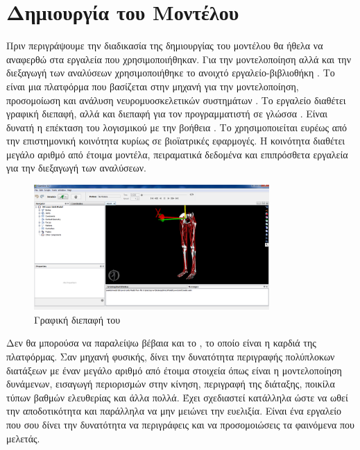 \section{Δημιουργία του Μοντέλου}

Πριν περιγράψουμε την διαδικασία της δημιουργίας του μοντέλου θα ήθελα να αναφερθώ στα εργαλεία που χρησιμοποιήθηκαν. Για την μοντελοποίηση αλλά και την διεξαγωγή των αναλύσεων χρησιμοποιήθηκε το ανοιχτό εργαλείο-βιβλιοθήκη . Το  είναι μια πλατφόρμα που βασίζεται στην μηχανή  για την μοντελοποίηση, προσομοίωση και ανάλυση νευρομυοσκελετικών συστημάτων \cite{delp07}. Το εργαλείο διαθέτει γραφική διεπαφή, αλλά και διεπαφή για τον προγραμματιστή σε γλώσσα . Είναι δυνατή η επέκταση του λογισμικού με την βοήθεια . Το  χρησιμοποιείται ευρέως από την επιστημονική κοινότητα κυρίως σε βιοϊατρικές εφαρμογές. Η κοινότητα διαθέτει μεγάλο αριθμό από έτοιμα μοντέλα, πειραματικά δεδομένα και επιπρόσθετα εργαλεία για την διεξαγωγή των αναλύσεων.

\begin{figure}[H]
    \centering
    \includegraphics[width=0.8\textwidth, keepaspectratio]{fig/opensim.png}
    \caption{Γραφική διεπαφή του }
    \label{fig:opensim-gui}
\end{figure}

Δεν θα μπορούσα να παραλείψω βέβαια και το , το οποίο είναι η καρδιά της πλατφόρμας. Σαν μηχανή φυσικής, δίνει την δυνατότητα περιγραφής πολύπλοκων διατάξεων με έναν μεγάλο αριθμό από έτοιμα στοιχεία όπως είναι η μοντελοποίηση δυνάμενων, εισαγωγή περιορισμών στην κίνηση, περιγραφή της διάταξης, ποικίλα τύπων βαθμών ελευθερίας και άλλα πολλά. Έχει σχεδιαστεί κατάλληλα ώστε να ωθεί την αποδοτικότητα και παράλληλα να μην μειώνει την ευελιξία. Είναι ένα εργαλείο που σου δίνει την δυνατότητα να περιγράφεις και να προσομοιώσεις τα φαινόμενα που μελετάς.

